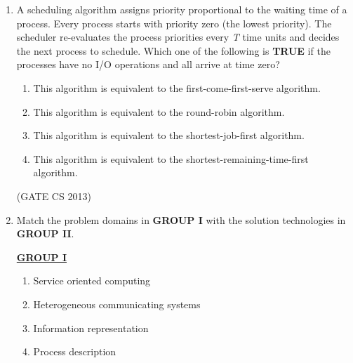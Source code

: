 \documentclass[a4paper, 11pt]{article}
\begin{document}
\begin{enumerate}
     \item A scheduling algorithm assigns priority proportional to the waiting time of a process. Every process starts with priority zero (the lowest priority). The scheduler re-evaluates the process priorities every \textit{T} time units and decides the next process to schedule. Which one of the following is \textbf{TRUE} if the processes have no I/O operations and all arrive at time zero? 
     \begin{enumerate}
         \item This algorithm is equivalent to the first-come-first-serve algorithm. 
         \item This algorithm is equivalent to the round-robin algorithm.
         \item This algorithm is equivalent to the shortest-job-first algorithm. 
         \item This algorithm is equivalent to the shortest-remaining-time-first algorithm. 
     \end{enumerate}

     \hfill (GATE CS 2013)
     
     \item Match the problem domains in \textbf{GROUP I} with the solution technologies in \textbf{GROUP II}. 
     \begin{center}
     \begin{multicols}{2}
    \noindent\textbf{\underline{GROUP I}}
    \begin{enumerate}[label=(\Alph*)]
        \item Service oriented computing
        \item Heterogeneous communicating systems
        \item Information representation
        \item Process description
    \end{enumerate}

    \columnbreak


\end{multicols}
\end{center}
\end{enumerate}
\end{document}
